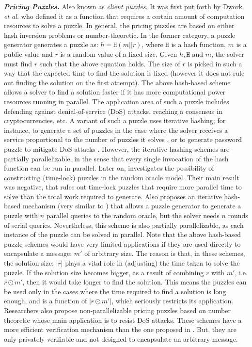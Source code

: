 \noindent\textbf{\textit{Pricing Puzzles.}} Also known as \emph{client puzzles}. It was first put forth by Dwork \textit{et al.} \cite{DworkN92} who defined it as a function that requires a certain amount of computation resources to solve a puzzle.  In general, the pricing puzzles are based on either hash inversion problems or number-theoretic. In the former category, 
a puzzle generator  generates a puzzle as: $h= \mathtt{H}(m||r)$, where $\mathtt{H}$ is a hash function, $m$ is a public value and $r$ is a random value of a fixed size. Given $h, \mathtt{H}$ and $m$, the solver must find $r$ such that the above equation holds. The size of $r$ is picked in such a way that the expected time to find the solution is fixed (however it does not rule out finding the solution on the first attempt). The above hash-based scheme allows a solver to find a solution faster if it has more computational power resources  running in parallel. The application area of such a puzzle includes  defending against denial-of-service (DoS)  attacks, reaching a consensus in cryptocurrencies, etc. A  variant  of such a puzzle uses iterative hashing; for instance, to generate a set of puzzles  in the case where the solver receives a service proportional to the number of puzzles it solves \cite{groza2006chained},  or to generate password puzzle to mitigate DoS attacks \cite{Ma05}. However, the iterative hashing schemes are partially parallelizable, in the sense that every single invocation of the hash function can be run in parallel. Later on,  \cite{MahmoodyMV11} investigates the possibility of constructing (time-lock) puzzles in the random oracle model.  Their main result was negative, that rules out time-lock puzzles that require more parallel time to solve than the total work required to generate.  Also \cite{MahmoodyMV11} proposes an iterative hash-based mechanism (very similar to \cite{Ma05}) that allows a puzzle generator to generate a puzzle with $n$ parallel queries to the random oracle, but the solver needs $n$ rounds of serial queries. Nevertheless, this scheme is also partially parallelizable, as each instance of the puzzle can be solved in parallel. Note that the above hash-based puzzle schemes would have very limited applications if they are used directly to  encapsulate a message: $m'$ of arbitrary size. The reason is that, in these schemes,  the solution  size: $|r|$ plays a vital role in (adjusting) the  time taken to solve the puzzle. If the solution size becomes bigger, as a result of combining $r$ with $m'$, i.e. $r \odot m'$, then it would take longer to find the solution. This means  the puzzles can be used only in the cases where  the time required to find a solution is long enough, and is a function of $|r \odot m'|$, which seriously restricts its application. Researchers also propose non-parallelizable pricing puzzles based on number theoretic \cite{WatersJHF04,KuppusamyRSBN12,KarameC10} whose main application is to resist DoS attacks. These schemes  have a more efficient verification mechanism than the one proposed in \cite{Rivest:1996:TPT:888615}. But, they are only privately verifiable and not designed to encapsulate an arbitrary message. 





